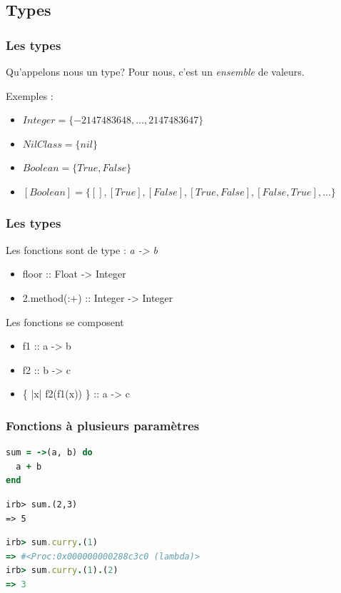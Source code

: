 \documentclass{beamer}
\begin{document}
\subsection{Types}
\begin{frame}
\frametitle{Les types}
\begin{block}{Qu'appelons nous un type?}
Pour nous, c'est un \emph{ensemble} de valeurs.
\end{block}
\pause
\begin{exampleblock}{Exemples :}
\begin{itemize}
\item $Integer = \{-2 147 483 648, \dots, 2 147 483 647\}$
\item $NilClass = \{nil\}$
\item $Boolean = \{True, False\}$
\pause
\item $[Boolean] = \{[], [True], [False], [True, False], [False, True], \dots\}$
\end{itemize}
\end{exampleblock}
\end{frame}

\begin{frame}
\frametitle{Les types}
\begin{block}{Les fonctions sont de type : \emph{a -> b}}
\begin{itemize}
\item floor           :: Float -> Integer
\item 2.method(:+)    :: Integer -> Integer
\end{itemize}
\end{block}
\begin{block}{Les fonctions se composent}
\begin{itemize}
\item f1 :: a -> b
\item f2 :: b -> c
\item \{ |x| f2(f1(x)) \} :: a -> c
\end{itemize}
\end{block}
\end{frame}

\begin{frame}[fragile]
\frametitle{Fonctions à plusieurs paramètres}
\begin{block}{}
\begin{lstlisting}[language=ruby,basicstyle=\ttfamily,keywordstyle=\color{red}]
sum = ->(a, b) do
  a + b
end
\end{lstlisting}
\end{block}
\pause
\begin{block}{}
\begin{lstlisting}
irb> sum.(2,3)
=> 5
\end{lstlisting}
\end{block}
\pause
\begin{block}{}
\begin{lstlisting}[language=ruby,basicstyle=\ttfamily,keywordstyle=\color{red}]
irb> sum.curry.(1)
=> #<Proc:0x000000000288c3c0 (lambda)>
irb> sum.curry.(1).(2)
=> 3
\end{lstlisting}
\end{block}
\end{frame}
\end{document}
